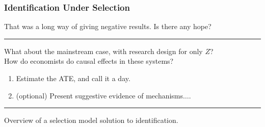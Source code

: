 \documentclass[dvipsnames,handout]{beamer} %
\begin{document}
\begin{frame}[noframenumbering]
    \frametitle{Identification Under Selection}
    That was a long way of giving negative results.
    Is there any hope?
    \par\noindent\rule{\textwidth}{0.4pt}
    \vskip0.25cm
    What about the mainstream case, with research design for only $Z$?\\
    How do economists do causal effects in these systems?
    \begin{enumerate}
        \item Estimate the ATE, and call it a day.
        \item (optional) Present suggestive evidence of mechanisms$\hdots$.
        \hyperlink{suggestive-evidence}{}
    \end{enumerate}
    \vskip0.5cm
    \par\noindent\rule{\textwidth}{0.4pt}
    Overview of a selection model solution to identification.
\end{frame}
\end{document}
